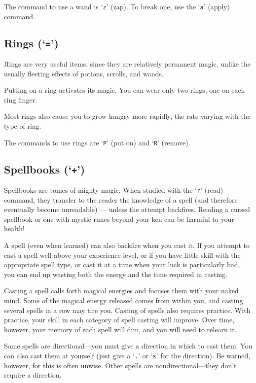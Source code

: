 The command to use a wand is `{\tt z}' (zap).  To break one, use the `{\tt a}'
(apply) command.

\subsection*{Rings (`{\tt =}')}

Rings are very useful items, since they are relatively permanent
magic, unlike the usually fleeting effects of potions, scrolls, and
wands.

Putting on a ring activates its magic.  You can wear only two
rings, one on each ring finger.

Most rings also cause you to grow hungry more rapidly, the rate
varying with the type of ring.

The commands to use rings are `{\tt P}' (put on) and `{\tt R}' (remove).

\subsection*{Spellbooks (`{\tt +}')}

Spellbooks are tomes of mighty magic.  When studied with the `{\tt r}' (read)
command, they transfer to the reader the knowledge of a spell (and
therefore eventually become unreadable) --- unless the attempt backfires.
Reading a cursed spellbook or one with mystic runes beyond
your ken can be harmful to your health!

A spell (even when learned) can also backfire when you cast it.  If you
attempt to cast a spell well above your experience level, or if you have
little skill with the appropriate spell type, or cast it at
a time when your luck is particularly bad, you can end up wasting both the
energy and the time required in casting.

Casting a spell calls forth magical energies and focuses them with
your naked mind.  Some of the magical energy released comes from within
you, and casting several spells in a row may tire you.
Casting of spells also requires practice.  With practice, your
skill in each category of spell casting will improve.  Over time, however,
your memory of each spell will dim, and you will need to relearn it.

Some spells are
directional---you must give a direction in which to cast them.  You can also
cast them at yourself (just give a `{\tt .}' or `{\tt s}' for the direction).
Be warned, however, for this is often unwise.  Other spells are
nondirectional---they don't require a direction.

